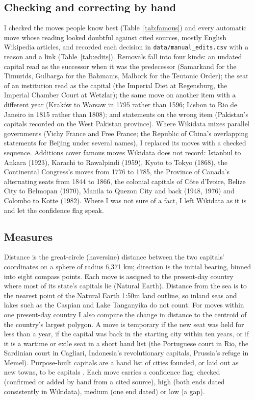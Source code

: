 \documentclass[11pt,a4paper]{article}
\begin{document}
\subsection{Checking and correcting by hand}
I checked the moves people know best (Table~\ref{tab:famous}) and every automatic move whose reading looked doubtful against cited sources, mostly English Wikipedia articles, and recorded each decision in \texttt{data/manual\_edits.csv} with a reason and a link (Table~\ref{tab:edits}). Removals fall into four kinds: an undated capital read as the successor when it was the predecessor (Samarkand for the Timurids, Gulbarga for the Bahmanis, Malbork for the Teutonic Order); the seat of an institution read as the capital (the Imperial Diet at Regensburg, the Imperial Chamber Court at Wetzlar); the same move on another item with a different year (Kraków to Warsaw in 1795 rather than 1596; Lisbon to Rio de Janeiro in 1815 rather than 1808); and statements on the wrong item (Pakistan's capitals recorded on the West Pakistan province). Where Wikidata mixes parallel governments (Vichy France and Free France; the Republic of China's overlapping statements for Beijing under several names), I replaced its moves with a checked sequence. Additions cover famous moves Wikidata does not record: Istanbul to Ankara (1923), Karachi to Rawalpindi (1959), Kyoto to Tokyo (1868), the Continental Congress's moves from 1776 to 1785, the Province of Canada's alternating seats from 1844 to 1866, the colonial capitals of Côte d'Ivoire, Belize City to Belmopan (1970), Manila to Quezon City and back (1948, 1976) and Colombo to Kotte (1982). Where I was not sure of a fact, I left Wikidata as it is and let the confidence flag speak.

\subsection{Measures}
Distance is the great-circle (haversine) distance between the two capitals' coordinates on a sphere of radius 6{,}371 km; direction is the initial bearing, binned into eight compass points. Each move is assigned to the present-day country where most of its state's capitals lie (Natural Earth). Distance from the sea is to the nearest point of the Natural Earth 1:50m land outline, so inland seas and lakes such as the Caspian and Lake Tanganyika do not count. For moves within one present-day country I also compute the change in distance to the centroid of the country's largest polygon. A move is temporary if the new seat was held for less than a year, if the capital was back in the starting city within ten years, or if it is a wartime or exile seat in a short hand list (the Portuguese court in Rio, the Sardinian court in Cagliari, Indonesia's revolutionary capitals, Prussia's refuge in Memel). Purpose-built capitals are a hand list of cities founded, or laid out as new towns, to be capitals \citep{wikiplanned}. Each move carries a confidence flag: checked (confirmed or added by hand from a cited source), high (both ends dated consistently in Wikidata), medium (one end dated) or low (a gap).
\end{document}
